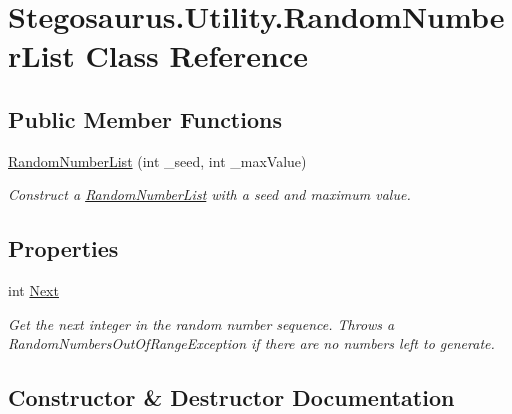 \hypertarget{class_stegosaurus_1_1_utility_1_1_random_number_list}{}\section{Stegosaurus.\+Utility.\+Random\+Number\+List Class Reference}
\label{class_stegosaurus_1_1_utility_1_1_random_number_list}
\subsection*{Public Member Functions}
\begin{DoxyCompactItemize}
\item 
\hyperlink{class_stegosaurus_1_1_utility_1_1_random_number_list_aecb1a902942855613d04254663b2e415}{Random\+Number\+List} (int \+\_\+seed, int \+\_\+max\+Value)
\begin{DoxyCompactList}\small\item\em Construct a \hyperlink{class_stegosaurus_1_1_utility_1_1_random_number_list}{Random\+Number\+List} with a seed and maximum value. \end{DoxyCompactList}\end{DoxyCompactItemize}
\subsection*{Properties}
\begin{DoxyCompactItemize}
\item 
int \hyperlink{class_stegosaurus_1_1_utility_1_1_random_number_list_ae0059e85d2b7c12ec6d08cc28e206d5a}{Next}
\begin{DoxyCompactList}\small\item\em Get the next integer in the random number sequence. Throws a Random\+Numbers\+Out\+Of\+Range\+Exception if there are no numbers left to generate. \end{DoxyCompactList}\end{DoxyCompactItemize}


\subsection{Constructor \& Destructor Documentation}
